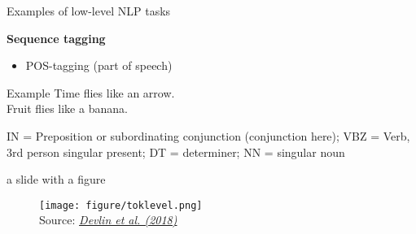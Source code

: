 
\begin{vbframe}{Examples of low-level NLP tasks}


\textbf{Sequence tagging}

\begin{itemize}
	\item POS-tagging (part of speech)
\end{itemize}

\begin{exampleblock}{Example}
		Time flies  like   an   arrow.		\\ Fruit\POS{NN}   flies   like   a   banana.
\end{exampleblock}

\begin{footnotesize}
IN = Preposition or subordinating conjunction (conjunction here); VBZ = Verb, 3rd person singular present; DT = determiner; NN = singular noun
\end{footnotesize}

\vfill

\end{vbframe}


\begin{vbframe}{a slide with a figure}

\vfill

	\begin{figure}
		\centering
		\texttt{[image: figure/toklevel.png]}\\ 
		\footnotesize{Source:} \href{https://arxiv.org/pdf/1810.04805.pdf}{\footnotesize \it Devlin et al. (2018)}
	\end{figure}

\vfill

\end{vbframe}

